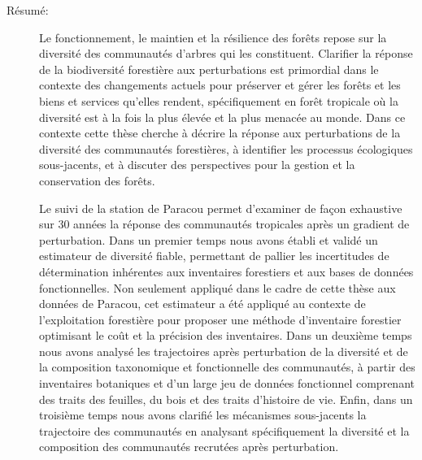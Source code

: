 \documentclass[
  11pt,
  french,
  A4paper,
  extrafontsizes,onecolumn,openright
  ]{memoir}
\begin{document}
\begin{normalsize}

\begin{description}

\item[Résumé:]
Le fonctionnement, le maintien et la résilience des forêts repose sur la
diversité des communautés d'arbres qui les constituent. Clarifier la
réponse de la biodiversité forestière aux perturbations est primordial
dans le contexte des changements actuels pour préserver et gérer les
forêts et les biens et services qu'elles rendent, spécifiquement en
forêt tropicale où la diversité est à la fois la plus élevée et la plus
menacée au monde. Dans ce contexte cette thèse cherche à décrire la
réponse aux perturbations de la diversité des communautés forestières, à
identifier les processus écologiques sous-jacents, et à discuter des
perspectives pour la gestion et la conservation des forêts.

Le suivi de la station de Paracou permet d'examiner de façon exhaustive
sur 30 années la réponse des communautés tropicales après un gradient de
perturbation. Dans un premier temps nous avons établi et validé un
estimateur de diversité fiable, permettant de pallier les incertitudes
de détermination inhérentes aux inventaires forestiers et aux bases de
données fonctionnelles. Non seulement appliqué dans le cadre de cette
thèse aux données de Paracou, cet estimateur a été appliqué au contexte
de l'exploitation forestière pour proposer une méthode d'inventaire
forestier optimisant le coût et la précision des inventaires. Dans un
deuxième temps nous avons analysé les trajectoires après perturbation de
la diversité et de la composition taxonomique et fonctionnelle des
communautés, à partir des inventaires botaniques et d'un large jeu de
données fonctionnel comprenant des traits des feuilles, du bois et des
traits d'histoire de vie. Enfin, dans un troisième temps nous avons
clarifié les mécanismes sous-jacents la trajectoire des communautés en
analysant spécifiquement la diversité et la composition des communautés
recrutées après perturbation.


\end{description}
\end{normalsize}
\end{document}
